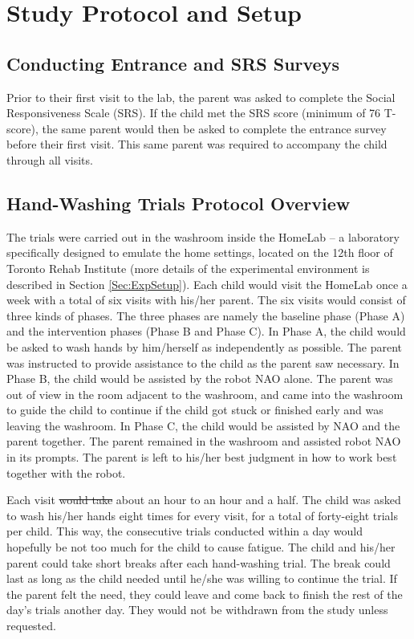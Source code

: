 \documentclass{ut-thesis}
\providecommand{\DIFaddtex}[1]{{\protect\color{blue}\uwave{#1}}} %
\providecommand{\DIFdeltex}[1]{{\protect\color{red}\sout{#1}}}                      %
\providecommand{\DIFaddbegin}{} %
\providecommand{\DIFaddend}{} %
\providecommand{\DIFdelbegin}{} %
\providecommand{\DIFdelend}{} %
\providecommand{\DIFadd}[1]{\texorpdfstring{\DIFaddtex{#1}}{#1}} %
\providecommand{\DIFdel}[1]{\texorpdfstring{\DIFdeltex{#1}}{}} %
\begin{document}
\section{Study Protocol and Setup}
\label{sec:StudyProtocol}

\subsection{Conducting Entrance and SRS Surveys}
Prior to their first visit to the lab, the parent was asked to complete the Social Responsiveness Scale (SRS). If the child met the SRS score (minimum of 76 T-score), the same parent would then be asked to complete the entrance survey before their first visit. This same parent was required to accompany the child through all visits.


\subsection{Hand-Washing Trials Protocol Overview}
\label{sec:ProtocolOverview}
The trials were carried out in the washroom inside the HomeLab -- a laboratory specifically designed to emulate the home settings, located on the 12th floor of Toronto Rehab Institute (more details of the experimental environment is described in Section \ref{Sec:ExpSetup}).  Each child would visit the HomeLab once a week with a total of six visits with his/her parent. The six visits would consist of three kinds of phases. The three phases are namely the baseline phase (Phase A) and the intervention phases (Phase B and Phase C). In Phase A, the child would be asked to wash hands by him/herself as independently as possible. The parent was instructed to provide assistance to the child as the parent saw necessary.  In Phase B, the child would be assisted by the robot NAO alone.  The parent was out of view in the room adjacent to the washroom, and came into the washroom to guide the child to continue if the child got stuck or finished early and was leaving the washroom.  In Phase C, the child would be assisted by NAO and the parent together.  The parent remained in the washroom and assisted robot NAO in its prompts.  The parent is left to his/her best judgment in how to work best together with the robot.

Each visit \DIFdelbegin \DIFdel{would take }\DIFdelend \DIFaddbegin \DIFadd{took }\DIFaddend about an hour to an hour and a half. The child was asked to wash his/her hands eight times for every visit, for a total of forty-eight trials per child.  This way, the consecutive trials conducted within a day would hopefully be not too much for the child to cause fatigue.  The child and his/her parent could take short breaks after each hand-washing trial.  The break could last as long as the child needed until he/she was willing to continue the trial. If the parent felt the need, they could leave and come back to finish the rest of the day's trials another day. They would not be withdrawn from the study unless requested.
\end{document}
